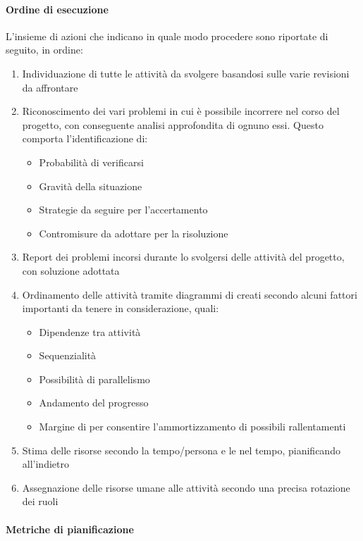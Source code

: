 			\paragraph{Ordine di esecuzione}
			L'insieme di azioni che indicano in quale modo procedere sono riportate di seguito, in ordine:
			\begin{enumerate}
				\item Individuazione di tutte le attività da svolgere basandosi sulle varie revisioni da affrontare
				\item Riconoscimento dei vari problemi in cui è possibile incorrere nel corso del progetto, con conseguente analisi
					approfondita di ognuno essi. Questo comporta l'identificazione di:
				\begin{itemize}
					\item Probabilità di verificarsi
					\item Gravità della situazione
					\item Strategie da seguire per l'accertamento
					\item Contromisure da adottare per la risoluzione
				\end{itemize}
				\item Report dei problemi incorsi durante lo svolgersi delle attività del progetto, con soluzione adottata
				\item Ordinamento delle attività tramite diagrammi di  creati secondo alcuni fattori importanti da tenere
				in considerazione, quali:
				\begin{itemize}
					\item Dipendenze tra attività
					\item Sequenzialità
					\item Possibilità di parallelismo
					\item Andamento del progresso
					\item Margine di  per consentire l'ammortizzamento di possibili rallentamenti
				\end{itemize}
			\item Stima delle risorse secondo la  tempo/persona e le  nel tempo, pianificando all'indietro
			\item Assegnazione delle risorse umane alle attività secondo una precisa rotazione dei ruoli
			\end{enumerate}


			\paragraph{Metriche di pianificazione} \label{ProcessiOrganizzativiMetriche}

